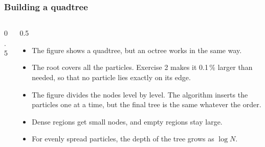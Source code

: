 \begin{frame}
  \frametitle{Building a quadtree}
  \begin{columns}[T]
    \begin{column}{0.5\textwidth}
      \centering
      
    \end{column}

    \begin{column}{0.5\textwidth}
      \begin{itemize}
        \item The figure shows a quadtree, but an octree works in the same way.
        \item The root covers all the particles. Exercise 2 makes it 0.1\,\% larger than needed, so that no particle lies exactly on its edge.
        \item The figure divides the nodes level by level. The algorithm inserts the particles one at a time, but the final tree is the same whatever the order.
        \item Dense regions get small nodes, and empty regions stay large.
        \item For evenly spread particles, the depth of the tree grows as $\log N$.
      \end{itemize}
    \end{column}
  \end{columns}
\end{frame}


